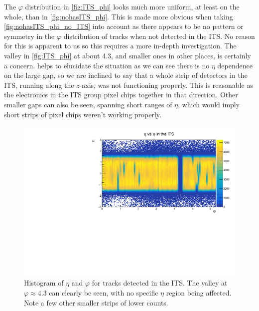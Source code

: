 The $\varphi$ distribution in \cref{fig:ITS_phi} looks much more uniform, at least on the whole, than in \cref{fig:nohasITS_phi}. This is made more obvious when taking \cref{fig:nohasITS_phi_no_ITS} into account as there appears to be no pattern or symmetry in the $\varphi$ distribution of tracks when not detected in the ITS. No reason for this is apparent to us so this requires a more in-depth investigation. The valley in \cref{fig:ITS_phi} at about 4.3, and smaller ones in other places, is certainly a concern.  helps to elucidate the situation as we can see there is no $\eta$ dependence on the large gap, so we are inclined to say that a whole strip of detectors in the ITS, running along the $z$-axis, was not functioning properly. This is reasonable as the electronics in the ITS group pixel chips together in that direction. Other smaller gaps can also be seen, spanning short ranges of $\eta$, which would imply short strips of pixel chips weren't working properly.

\begin{figure}[h]
    \begin{center}
        \includegraphics[width=.8\textwidth]{Plots/pass4_TracksIU/eta_phi.pdf}
        \caption[$\eta$-$\varphi$ histogram for tracks in the ITS]{Histogram of $\eta$ and $\varphi$ for tracks detected in the ITS. The valley at $\varphi\approx 4.3$ can clearly be seen, with no specific $\eta$ region being affected. Note a few other smaller strips of lower counts.}
        \label{fig:ITS_eta_phi}
    \end{center}
\end{figure}

